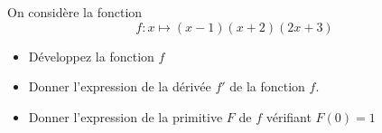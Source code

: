 \bexo
On considère la fonction
\begin{equation}
	f:x\mapsto (x-1)(x+2)(2x+3)
\end{equation}
\begin{itemize}
	\item Développez la fonction $f$
	\item Donner l'expression de la dérivée $f'$ de la fonction $f$.
	\item Donner l'expression de la primitive $F$ de $f$ vérifiant $F(0)=1$
\end{itemize}
\eexo
{}

